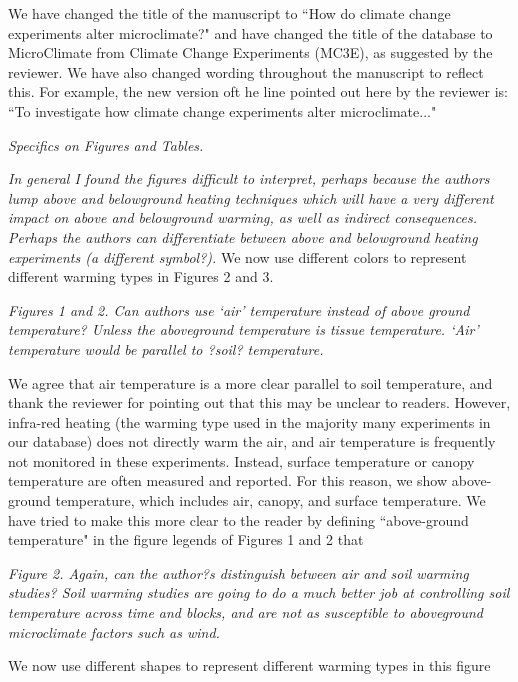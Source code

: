 \documentclass[11pt,a4paper]{letter}
\begin{document}
\par We have changed the title of the manuscript to ``How do climate change experiments alter microclimate?" and have changed the title of the database to MicroClimate from Climate Change Experiments (MC3E), as suggested by the reviewer. We have also changed wording throughout the manuscript to reflect this. For example, the new version oft he line pointed out here by the reviewer is: ``To investigate how climate change experiments alter microclimate..."

\par \emph{Specifics on Figures and Tables.}
\par \emph{In general I found the figures difficult to interpret, perhaps because the authors lump above and belowground heating techniques which will have a very different impact on above and belowground warming, as well as indirect consequences.  Perhaps the authors can differentiate between above and belowground heating experiments (a different symbol?).}
We now use different colors  to represent different warming types in Figures 2 and 3.

\par \emph{Figures 1 and 2. Can authors use `air' temperature instead of above ground temperature? Unless the aboveground temperature is tissue temperature.  `Air' temperature would be parallel to ?soil? temperature. }
\par We agree that air temperature is a more clear parallel to soil temperature, and thank the reviewer for pointing out that this may be unclear to readers. However, infra-red heating (the warming type used in the majority many experiments in our database)  does not directly warm the air, and air temperature is frequently not monitored in these experiments. Instead, surface temperature or canopy temperature are often measured and reported. For this reason, we show above-ground temperature, which includes air, canopy, and surface temperature. We have tried to make this more clear to the reader by defining ``above-ground temperature" in the figure legends of Figures 1 and 2 that

\par \emph{Figure 2.  Again, can the author?s distinguish between air and soil warming studies?  Soil warming studies are going to do a much better job at controlling soil temperature across time and blocks, and are not as susceptible to aboveground microclimate factors such as wind.}
\par We now use different shapes to represent different warming types in this figure
\end{document}
